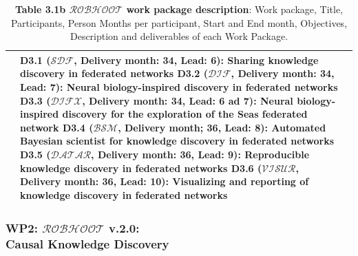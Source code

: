 \documentclass[11pt, a4paper]{article} %
\begin{document}
\begin{table}[h!]
\begin{center}
{\begin{tabular}{|m{3cm} || m{12cm} || m{1cm}|}
{    \hline
    \rowcolor{piggypink!20}
    {\bf Deliverables} & {\bf D3.1 ($\mathcal{SDF}$}, Delivery month: 34, Lead: 6): Sharing knowledge discovery in federated networks
                         {\bf D3.2 ($\mathcal{DIF}$}, Delivery month: 34, Lead: 7): Neural biology-inspired discovery in federated networks 
                         {\bf D3.3 ($\mathcal{DIFX}$}, Delivery month: 34, Lead: 6 ad 7): Neural biology-inspired discovery for the exploration of the Seas federated network
                         {\bf D3.4 ($\mathcal{BSM}$}, Delivery month; 36, Lead: 8): Automated Bayesian scientist for knowledge discovery in federated networks
                         {\bf D3.5 ($\mathcal{DATAR}$}, Delivery month: 36, Lead: 9): Reproducible knowledge discovery in federated networks
                         {\bf D3.6 ($\mathcal{VISUR}$}, Delivery month: 36, Lead: 10): Visualizing and reporting of knowledge discovery in federated networks & \\
    \hline\hline\hline
                 \end{tabular}
                 }
\end{center}
\caption*{{{\bf Table 3.1b  $\mathcal{ROBHOOT}$ work package description}: Work package,
    Title, Participants, Person Months per participant, Start and End
    month, Objectives, Description and deliverables of each Work
    Package.}}
\end{table}

\subsubsection{{\bf WP2: $\mathcal{ROBHOOT}$ v.2.0}: \\
  Causal Knowledge Discovery}
\end{document}

